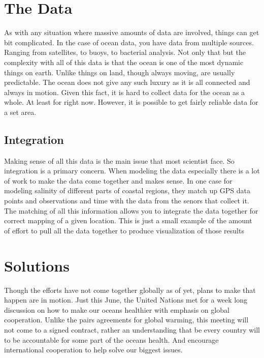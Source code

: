 \documentclass[sigconf]{acmart}
\begin{document}
\section{The Data}

As with any situation where massive amounts of data are involved,
things can get bit complicated.  In the case of ocean data, you have
data from multiple sources.  Ranging from satellites, to buoys, to
bacterial analysis.  Not only that but the complexity with all of this
data is that the ocean is one of the most dynamic things on earth.
Unlike things on land, though always moving, are usually predictable.
The ocean does not give any such luxury as it is all connected and
always in motion.  Given this fact, it is hard to collect data for the
ocean as a whole.  At least for right now.  However, it is possible to
get fairly reliable data for a set area.

\subsection{Integration}

Making sense of all this data is the main issue that most scientist
face.  So integration is a primary concern.  When modeling the data
especially there is a lot of work to make the data come together and
makes sense.  In one case for modeling salinity of different parts of
coastal regions, they match up GPS data points and observations and
time with the data from the senors that collect it.  The matching of
all this information allows you to integrate the data together for
correct mapping of a given location. \cite{Liu2016} This is just a
small example of the amount of effort to pull all the data together to
produce visualization of those results


\section{Solutions}

Though the efforts have not come together globally as of yet, plans to
make that happen are in motion. Just this June, the United Nations met
for a week long discussion on how to make our oceans healthier with
emphasis on global cooperation. \cite{Woody} Unlike the pairs
agreements for global warming, this meeting will not come to a signed
contract, rather an understanding that be every country will to be
accountable for some part of the oceans health.  And encourage
international cooperation to help solve our biggest issues.
\end{document}
